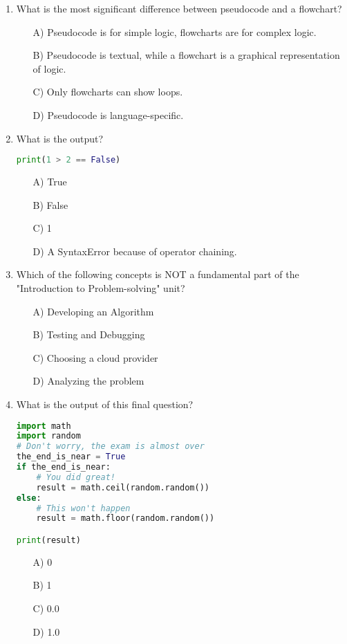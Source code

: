 \documentclass[9pt]{article}
\begin{document}
\begin{multicols}{2}
\begin{enumerate}
\item What is the most significant difference between pseudocode and a flowchart?
\begin{enumerate}
    \item[A)] Pseudocode is for simple logic, flowcharts are for complex logic.
    \item[B)] Pseudocode is textual, while a flowchart is a graphical representation of logic.
    \item[C)] Only flowcharts can show loops.
    \item[D)] Pseudocode is language-specific.
\end{enumerate}

\item What is the output?
\begin{lstlisting}[language=Python]
print(1 > 2 == False)
\end{lstlisting}
\begin{enumerate}
\item[A)] True
\item[B)] False
\item[C)] 1
\item[D)] A SyntaxError because of operator chaining.
\end{enumerate}

\item Which of the following concepts is NOT a fundamental part of the "Introduction to Problem-solving" unit?
\begin{enumerate}
    \item[A)] Developing an Algorithm
    \item[B)] Testing and Debugging
    \item[C)] Choosing a cloud provider
    \item[D)] Analyzing the problem
\end{enumerate}

\item What is the output of this final question?
\begin{lstlisting}[language=Python]
import math
import random
# Don't worry, the exam is almost over
the_end_is_near = True
if the_end_is_near:
    # You did great!
    result = math.ceil(random.random())
else:
    # This won't happen
    result = math.floor(random.random())

print(result)
\end{lstlisting}
\begin{enumerate}
\item[A)] 0
\item[B)] 1
\item[C)] 0.0
\item[D)] 1.0
\end{enumerate}


\end{enumerate}
\end{multicols}
\end{document}
